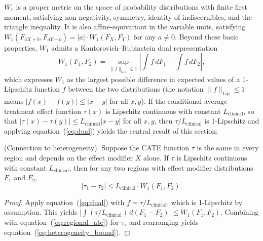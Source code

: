 \documentclass[AMA,Times1COL]{WileyNJDv5}
\begin{document}
$W_1$ is a proper metric on the space of probability distributions with finite first moment, satisfying non-negativity, symmetry, identity of indiscernibles, and the triangle inequality.\cite{villani2009} It is also affine-equivariant in the variable units, satisfying $W_1(F_{aX+b}, F_{aY+b}) = |a| \cdot W_1(F_X, F_Y)$ for any $a \neq 0$. Beyond these basic properties, $W_1$ admits a Kantorovich--Rubinstein dual representation\cite{villani2009}
\begin{equation}
W_1(F_1, F_2) = \sup_{\|f\|_{\text{Lip}} \leq 1} \left|\int f \, dF_1 - \int f \, dF_2\right|,
\label{eq:dual}
\end{equation}
which expresses $W_1$ as the largest possible difference in expected values of a 1-Lipschitz function $f$ between the two distributions (the notation $\|f\|_{\text{Lip}} \leq 1$ means $|f(x) - f(y)| \leq |x - y|$ for all $x, y$). If the conditional average treatment effect function $\tau(x)$ is Lipschitz continuous with constant $L_{\text{clinical}}$, so that $|\tau(x) - \tau(y)| \leq L_{\text{clinical}} |x - y|$ for all $x, y$, then $\tau / L_{\text{clinical}}$ is 1-Lipschitz and applying equation~(\ref{eq:dual}) yields the central result of this section:

\begin{proposition}\label{prop:heterogeneity}
\textup{(Connection to heterogeneity).} Suppose the CATE function $\tau$ is the same in every region and depends on the effect modifier $X$ alone. If $\tau$ is Lipschitz continuous with constant $L_{\text{clinical}}$, then for any two regions with effect modifier distributions $F_1$ and $F_2$,
\begin{equation}
|\bar{\tau}_1 - \bar{\tau}_2| \leq L_{\text{clinical}} \cdot W_1(F_1, F_2).
\label{eq:heterogeneity_bound}
\end{equation}
\end{proposition}

\begin{proof}
Apply equation~(\ref{eq:dual}) with $f = \tau / L_{\text{clinical}}$, which is 1-Lipschitz by assumption. This yields $\left|\int (\tau / L_{\text{clinical}}) \, d(F_1 - F_2)\right| \leq W_1(F_1, F_2)$. Combining with equation~(\ref{eq:regional_ate}) for $\bar{\tau}_r$ and rearranging yields equation~(\ref{eq:heterogeneity_bound}).
\end{proof}
\end{document}
